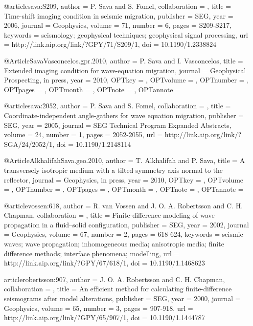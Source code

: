{@article{sava:S209,
author = {P. Sava and S. Fomel},
collaboration = {},
title = {Time-shift imaging condition in seismic migration},
publisher = {SEG},
year = {2006},
journal = {Geophysics},
volume = {71},
number = {6},
pages = {S209-S217},
keywords = {seismology; geophysical techniques; geophysical signal processing},
url = {http://link.aip.org/link/?GPY/71/S209/1},
doi = {10.1190/1.2338824}
}



@Article{SavaVasconcelos.gpr.2010,
  author = 	 {P. Sava and I. Vasconcelos},
  title = 	 {Extended imaging condition for wave-equation migration},
  journal = 	 {Geophysical Prospecting, in press},
  year = 	 {2010},
  OPTkey = 	 {},
  OPTvolume = 	 {},
  OPTnumber = 	 {},
  OPTpages = 	 {},
  OPTmonth = 	 {},
  OPTnote = 	 {},
  OPTannote = 	 {}
}



@article{sava:2052,
author = {P. Sava and S. Fomel},
collaboration = {},
title = {Coordinate-independent angle-gathers for wave equation migration},
publisher = {SEG},
year = {2005},
journal = {SEG Technical Program Expanded Abstracts},
volume = {24},
number = {1},
pages = {2052-2055},
url = {http://link.aip.org/link/?SGA/24/2052/1},
doi = {10.1190/1.2148114}
}


@Article{AlkhalifahSava.geo.2010,
  author = 	 {T. Alkhalifah and P. Sava},
  title = 	 {A transversely isotropic medium with a tilted
                  symmetry axis normal to the reflector},
  journal = 	 {Geophysics, in press},
  year = 	 {2010},
  OPTkey = 	 {},
  OPTvolume = 	 {},
  OPTnumber = 	 {},
  OPTpages = 	 {},
  OPTmonth = 	 {},
  OPTnote = 	 {},
  OPTannote = 	 {}
}


@article{vossen:618,
author = {R. van Vossen and J. O. A. Robertsson and C. H. Chapman},
collaboration = {},
title = {Finite-difference modeling of wave propagation in a fluid--solid configuration},
publisher = {SEG},
year = {2002},
journal = {Geophysics},
volume = {67},
number = {2},
pages = {618-624},
keywords = {seismic waves; wave propagation; inhomogeneous media; anisotropic media; finite difference methods; interface phenomena; modelling},
url = {http://link.aip.org/link/?GPY/67/618/1},
doi = {10.1190/1.1468623}
}

article{robertsson:907,
author = {J. O. A. Robertsson and C. H. Chapman},
collaboration = {},
title = {An efficient method for calculating finite-difference seismograms after model alterations},
publisher = {SEG},
year = {2000},
journal = {Geophysics},
volume = {65},
number = {3},
pages = {907-918},
url = {http://link.aip.org/link/?GPY/65/907/1},
doi = {10.1190/1.1444787}
}

}

